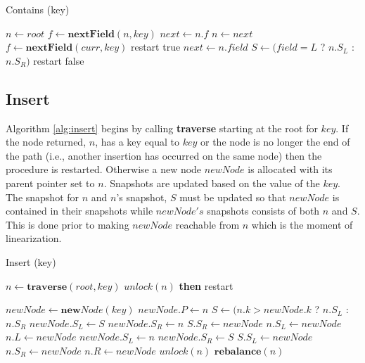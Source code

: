 \documentclass[conference]{IEEEtran}
\theoremstyle{definition}
\theoremstyle{theorem}
\begin{document}
\begin{algorithm}[t]
\caption{Contains (key)}
\label{alg:contains}
\begin{algorithmic}[1]
\State $n\gets root$
\State $f \gets \mathbf{nextField}(n, key)$
\State $next \gets n.f$
  \State $n\gets next$
  \State $f \gets \mathbf{nextField}(curr, key)$
  	 \label{alg:contains:lock}
  		\State restart
  	\EndIf
  	\State \Return true
	\EndIf
	\State $next \gets n.field$
\EndWhile
\State $S \gets (field = L$ ? $n.S_L$ : $n.S_R)$
 \label{alg:contains:snap}
\State restart
\EndIf
\State \Return false
\end{algorithmic}
\end{algorithm}

\subsection{Insert}
Algorithm \ref{alg:insert} begins by calling \textbf{traverse} starting at the root for $key$. If the node returned, $n$, has a key equal to $key$ or the node is no longer the end of the path (i.e., another insertion has occurred on the same node) then the procedure is restarted. Otherwise a new node $newNode$ is allocated with its parent pointer set to $n$. Snapshots are updated based on the value of the $key$. The snapshot for $n$ and $n$'s snapshot, $S$ must be updated so that $newNode$ is contained in their snapshots while $newNode's$ snapshots consists of both $n$ and $S$. This is done prior to making $newNode$ reachable from $n$ which is the moment of linearization. 
\begin{algorithm}[t]
\caption{Insert (key)}
\label{alg:insert}
\begin{algorithmic}[1]
\State $n\gets \mathbf{traverse}(root, key)$
	\State $unlock(n)$ \textbf{then} restart
\EndIf

\State $newNode\gets \mathbf{new} Node(key)$
\State $newNode.P \gets n$
\State $S \gets (n.k > newNode.k$ ? $n.S_L$ : $n.S_R$
\label{alg:insert:snaps}
	\State $newNode.S_L \gets S$
	\State $newNode.S_R \gets n$
	\State $S.S_R \gets newNode$
	\State $n.S_L \gets newNode$
	\State $n.L \gets newNode$
\Else
	\State $newNode.S_L \gets n$
	\State $newNode.S_R \gets S$
	\State $S.S_L \gets newNode$
	\State $n.S_R \gets newNode$
	\State $n.R \gets newNode$
\EndIf
\State $unlock(n)$
 $\mathbf{rebalance}(n)$
\EndIf
\end{algorithmic}
\end{algorithm}
\end{document}
